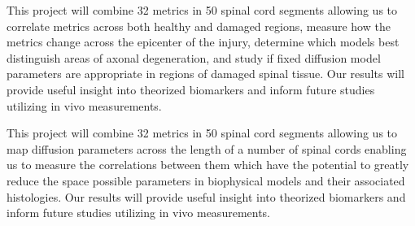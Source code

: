 This project will combine 32 metrics in 50 spinal cord segments allowing us to correlate \dmri metrics across both healthy and damaged regions, measure how the metrics change across the epicenter of the injury, determine which models best distinguish areas of axonal degeneration, and study if fixed diffusion model parameters are appropriate in regions of damaged spinal tissue. Our results will provide useful insight into theorized biomarkers and inform future studies utilizing in vivo measurements. 

This project will combine 32 metrics in 50 spinal cord segments allowing us to map diffusion parameters across the length of a number of spinal cords enabling us to measure the correlations between them which have the potential to greatly reduce the space possible parameters in biophysical models and their associated histologies. Our results will provide useful insight into theorized biomarkers and inform future studies utilizing in vivo measurements. 
\fi




